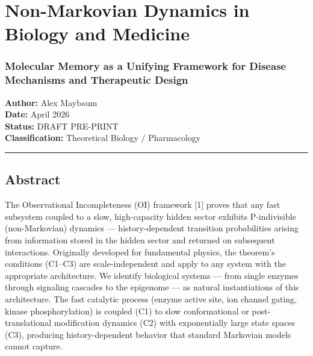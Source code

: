 \documentclass[
]{article}
\author{}
\date{}
\begin{document}
\hypertarget{non-markovian-dynamics-in-biology-and-medicine}{%
\section{Non-Markovian Dynamics in Biology and
Medicine}\label{non-markovian-dynamics-in-biology-and-medicine}}

\hypertarget{molecular-memory-as-a-unifying-framework-for-disease-mechanisms-and-therapeutic-design}{%
\subsubsection{Molecular Memory as a Unifying Framework for Disease
Mechanisms and Therapeutic
Design}\label{molecular-memory-as-a-unifying-framework-for-disease-mechanisms-and-therapeutic-design}}

\textbf{Author:} Alex Maybaum\\
\textbf{Date:} April 2026\\
\textbf{Status:} DRAFT PRE-PRINT\\
\textbf{Classification:} Theoretical Biology / Pharmacology

\begin{center}\rule{0.5\linewidth}{0.5pt}\end{center}

\hypertarget{abstract}{%
\subsection{Abstract}\label{abstract}}

The Observational Incompleteness (OI) framework {[}1{]} proves that any
fast subsystem coupled to a slow, high-capacity hidden sector exhibits
P-indivisible (non-Markovian) dynamics --- history-dependent transition
probabilities arising from information stored in the hidden sector and
returned on subsequent interactions. Originally developed for
fundamental physics, the theorem's conditions (C1--C3) are
scale-independent and apply to any system with the appropriate
architecture. We identify biological systems --- from single enzymes
through signaling cascades to the epigenome --- as natural
instantiations of this architecture. The fast catalytic process (enzyme
active site, ion channel gating, kinase phosphorylation) is coupled (C1)
to slow conformational or post-translational modification dynamics (C2)
with exponentially large state spaces (C3), producing history-dependent
behavior that standard Markovian models cannot capture.
\end{document}
